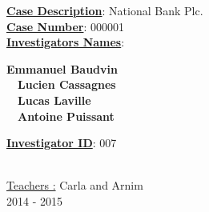 \begin{titlepage}
\begin{center}
        \Large
        \vspace{1cm}
        \begin{minipage}{.8\textwidth}
          \underline{\textbf{Case Description}}: National Bank Plc.\\
          \underline{\textbf{Case Number}}: 000001\\
          \underline{\textbf{Investigators Names}}:
          \begin{center}
	    \textbf{Emmanuel Baudvin}\\~~\textbf{Lucien Cassagnes}\\~~\textbf{Lucas Laville}\\~~\textbf{Antoine Puissant}\\
          \end{center}
          \underline{\textbf{Investigator ID}}: 007\\
        \end{minipage}~\\
	\LARGE
        \vspace{0.8cm}
        \Large
        \underline{Teachers :} Carla and Arnim\\
        \vspace{0.5cm}
        2014 - 2015%
        
    \end{center}
\end{titlepage}